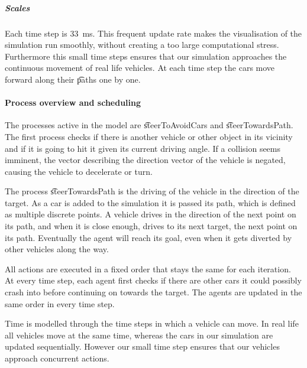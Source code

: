 	\subparagraph{Scales}
	Each time step is \si{33 \milli\second}. This frequent update rate makes the visualisation of the simulation run smoothly, without creating a too large computational stress. Furthermore this small time steps ensures that our simulation approaches the continuous movement of real life vehicles. 
	At each time step the cars move forward along their \t{paths} one by one. 





\paragraph{Process overview and scheduling}
\label{par:method:model:overview:process}

The processes active in the model are \t{steerToAvoidCars} and \t{steerTowardsPath}. The first process checks if there is another vehicle or other object in its vicinity and if it is going to hit it given its current driving angle. If a collision seems imminent, the vector describing the direction vector of the vehicle is negated, causing the vehicle to decelerate or turn.

The process \t{steerTowardsPath} is the driving of the vehicle in the direction of the target. As a car is added to the simulation it is passed its path, which is defined as multiple discrete points.  A vehicle drives in the direction of the next point on its path, and when it is close enough, drives to its next target, the next point on its path. Eventually the agent will reach its goal, even when it gets diverted by other vehicles along the way.

All actions are executed in a fixed order that stays the same for each iteration. At every time step, each agent first checks if there are other cars it could possibly crash into before continuing on towards the target. The agents are updated in the same order in every time step.

Time is modelled through the time steps in which a vehicle can move. In real life all vehicles move at the same time, whereas the cars in our simulation are updated sequentially. However our small time step ensures that our vehicles approach concurrent actions. 


